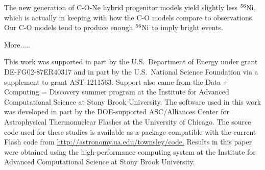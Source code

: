 \documentclass[iop,apj]{emulateapj}
\newcommand{\Ni}[1]{\ensuremath{{}^{#1}{\rm Ni}}}
\begin{document}
The new generation of C-O-Ne hybrid progenitor models yield
slightly less \Ni{56}, which is actually in keeping with how
the C-O models compare to observations. Our C-O models tend
to produce enough \Ni{56} to imply bright events. 

More.....

This work was supported in part by the U.S.\ Department of Energy under
grant DE-FG02-87ER40317 and in part by the U.S.\ National Science Foundation
via a supplement to grant AST-1211563. 
Support also came from the Data + Computing = Discovery summer program at
the Institute for Advanced Computational Science at Stony Brook University.
The software used in this work was developed in part by the DOE-supported 
ASC/Alliances Center for Astrophysical Thermonuclear Flashes at the 
University of Chicago. 
The source code used for
these studies is available as a package compatible with the
current Flash code from \url{http://astronomy.ua.edu/townsley/code.}
Results in this
paper were obtained using the high-performance computing system at the
Institute for Advanced Computational Science at Stony Brook
University. 




\end{document}
